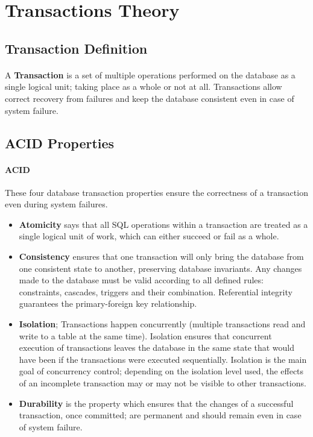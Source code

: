 
\section{Transactions Theory}
\subsection{Transaction Definition}
\paragraph{} A \textbf{Transaction} is a set of multiple operations performed on the database as a single logical unit; taking place as a whole or not at all. Transactions allow correct recovery from failures and keep the database consistent even in case of system failure.
\subsection{\acs{ACID} Properties}
\paragraph{\acf{ACID}} These four database transaction properties ensure the correctness of a transaction even during system failures.
\begin{itemize}
	\item \textbf{Atomicity} says that all SQL operations within a transaction are treated as a single logical unit of work, which can either succeed or fail as a whole.
	\item \textbf{Consistency} ensures that one transaction will only bring the database from one consistent state to another, preserving database invariants. Any changes made to the database must be valid according to all defined rules: constraints, cascades, triggers and their combination. Referential integrity guarantees the primary-foreign key relationship.
	\item \textbf{Isolation}; Transactions happen concurrently (multiple transactions read and write to a table at the same time). Isolation ensures that concurrent execution of transactions leaves the database in the same state that would have been if the transactions were executed sequentially. Isolation is the main goal of concurrency control; depending on the isolation level used, the effects of an incomplete transaction may or may not be visible to other transactions.
	\item \textbf{Durability} is the property which ensures that the changes of a successful transaction, once committed; are permanent and should remain even in case of system failure.
\end{itemize}
